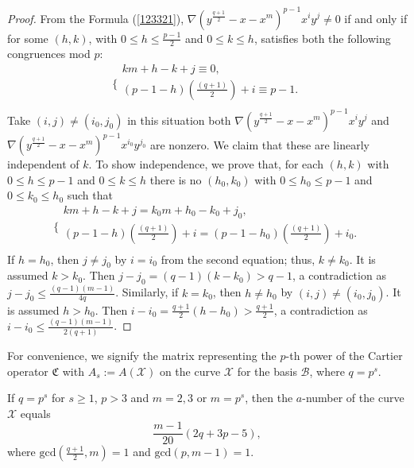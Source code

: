 \begin{proof}
From the Formula (\ref{123321}), $\nabla(y^{\frac{q+1}{2}}-x-x^{m})^{p-1}x^iy^j \neq 0$ if and only if for some $(h, k)$, with $0 \leq h \leq \frac{p-1}{2}$ and $0 \leq k\leq h$, satisfies both the following congruences mod $p$:
\begin{equation}\label{444}
\Bigg\{
             \begin{array}{c}
              km + h - k + j \equiv 0,\\
              (p - 1 - h)(\frac{(q+1)}{2}) + i \equiv p-1. \\
             \end{array}
\end{equation}
Take $(i, j) \neq(i_0, j_0)$ in this situation both $\nabla(y^{\frac{q+1}{2}}-x-x^{m})^{p-1}x^iy^j$ and $\nabla(y^{\frac{q+1}{2}}-x-x^{m})^{p-1}x^{i_0}y^{j_0}$ are nonzero. We claim that these are linearly independent of $k$. To show independence, we prove that, for each $(h, k)$ with $0 \leq h \leq p -1$ and $0 \leq k\leq h$ there is no $(h_0, k_0)$ with $0 \leq h_0\leq p -1$ and $0 \leq k_0\leq h_0$ such that
\begin{equation}\label{555}
  \Bigg\{
             \begin{array}{c}
             km + h - k + j = k_0m + h_0 - k_0 + j_0,\\
              (p - 1 - h)(\frac{(q+1)}{2}) + i = (p - 1 - h_0)(\frac{(q+1)}{2}) + i_0.\\
             \end{array}
\end{equation}
If $h=h_0$, then $j \neq j_0$ by $i=i_0$ from the second equation; thus, $k \neq k_0$. It is assumed $k >k_0$. Then $j -j_0=(q-1)(k -k_0)>q-1$, a contradiction as $j - j_0 \leq \frac{(q-1)(m-1)}{4q}$. Similarly, if $k=k_0$, then $h \neq h_0$ by $(i, j) \neq(i_0, j_0)$. It is assumed $h>h_0$. Then $i-i_0 = \frac{q+1}{2}(h-h_0)>\frac{q+1}{2}$, a contradiction as $i-i_0 \leq \frac{(q-1)(m-1)}{2(q+1)}$.
\end{proof}

For convenience, we signify the matrix representing the $p$-th power of the Cartier operator $\mathfrak{C}$ with $A_s:=A(\mathcal{X})$ on the curve $\mathcal{X}$ for the basis $\mathcal{B}$, where $q=p^s$.
\begin{theorem}\label{thex}
  If $q =p^s$ for $s \geq 1$, $p>3$ and $m=2, 3$ or $m=p^s$, then the $a$-number of the curve $\mathcal{X}$ equals
  $$\dfrac{m-1}{20}(2q+3p-5),$$
  where $\mbox{gcd}(\frac{q+1}{2},m)=1$ and $\mbox{gcd}(p,m-1)=1$.
\end{theorem}

